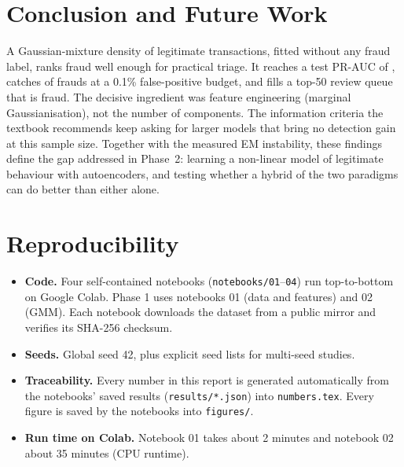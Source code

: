 \documentclass[12pt]{article}
\begin{document}
\section{Conclusion and Future Work}\label{sec:concl}
A Gaussian-mixture density of legitimate transactions, fitted without any fraud label, ranks fraud well enough for
practical triage. It reaches a test PR-AUC of \gmmTestAP{}, catches \gmmRecallA{} of frauds at a 0.1\% false-positive
budget, and fills a top-50 review queue that is \gmmPA{} fraud. The decisive ingredient was feature engineering
(marginal Gaussianisation), not the number of components. The information criteria the textbook recommends keep asking
for larger models that bring no detection gain at this sample size. Together with the measured EM instability, these
findings define the gap addressed in Phase~2: learning a non-linear model of legitimate behaviour with autoencoders,
and testing whether a hybrid of the two paradigms can do better than either alone.




\appendix
\section{Reproducibility}
\begin{itemize}
\item \textbf{Code.} Four self-contained notebooks (\texttt{notebooks/01}--\texttt{04}) run top-to-bottom on Google
Colab. Phase 1 uses notebooks 01 (data and features) and 02 (GMM). Each notebook downloads the dataset from a public
mirror and verifies its SHA-256 checksum.
\item \textbf{Seeds.} Global seed 42, plus explicit seed lists for multi-seed studies.
\item \textbf{Traceability.} Every number in this report is generated automatically from the notebooks' saved results
(\texttt{results/*.json}) into \texttt{numbers.tex}. Every figure is saved by the notebooks into \texttt{figures/}.
\item \textbf{Run time on Colab.} Notebook 01 takes about 2 minutes and notebook 02 about 35 minutes (CPU runtime).
\end{itemize}
\end{document}

